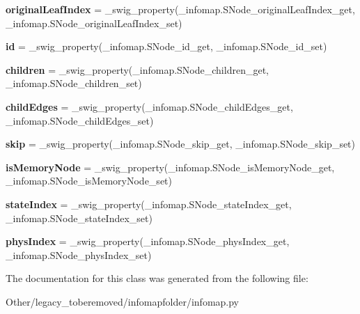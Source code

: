 \begin{DoxyCompactItemize}
{\bfseries original\+Leaf\+Index} = \+\_\+swig\+\_\+property(\+\_\+infomap.\+S\+Node\+\_\+original\+Leaf\+Index\+\_\+get, \+\_\+infomap.\+S\+Node\+\_\+original\+Leaf\+Index\+\_\+set)
\item 
\mbox{\label{classinfomapfolder_1_1infomap_1_1SNode_a147c3f7e69bb73ecd5c413b5bfb509f0}} 
{\bfseries id} = \+\_\+swig\+\_\+property(\+\_\+infomap.\+S\+Node\+\_\+id\+\_\+get, \+\_\+infomap.\+S\+Node\+\_\+id\+\_\+set)
\item 
\mbox{\label{classinfomapfolder_1_1infomap_1_1SNode_ab47222e1920c8f438c1836b3dea33eed}} 
{\bfseries children} = \+\_\+swig\+\_\+property(\+\_\+infomap.\+S\+Node\+\_\+children\+\_\+get, \+\_\+infomap.\+S\+Node\+\_\+children\+\_\+set)
\item 
\mbox{\label{classinfomapfolder_1_1infomap_1_1SNode_a2db4f3e0736e5939a3387071ffadd77d}} 
{\bfseries child\+Edges} = \+\_\+swig\+\_\+property(\+\_\+infomap.\+S\+Node\+\_\+child\+Edges\+\_\+get, \+\_\+infomap.\+S\+Node\+\_\+child\+Edges\+\_\+set)
\item 
\mbox{\label{classinfomapfolder_1_1infomap_1_1SNode_aa603552f919fac9853a80961069692c5}} 
{\bfseries skip} = \+\_\+swig\+\_\+property(\+\_\+infomap.\+S\+Node\+\_\+skip\+\_\+get, \+\_\+infomap.\+S\+Node\+\_\+skip\+\_\+set)
\item 
\mbox{\label{classinfomapfolder_1_1infomap_1_1SNode_a27a301faf60f217624e6d41e7a4f3f1e}} 
{\bfseries is\+Memory\+Node} = \+\_\+swig\+\_\+property(\+\_\+infomap.\+S\+Node\+\_\+is\+Memory\+Node\+\_\+get, \+\_\+infomap.\+S\+Node\+\_\+is\+Memory\+Node\+\_\+set)
\item 
\mbox{\label{classinfomapfolder_1_1infomap_1_1SNode_a838dd6eb236bd8158f351e17651d8847}} 
{\bfseries state\+Index} = \+\_\+swig\+\_\+property(\+\_\+infomap.\+S\+Node\+\_\+state\+Index\+\_\+get, \+\_\+infomap.\+S\+Node\+\_\+state\+Index\+\_\+set)
\item 
\mbox{\label{classinfomapfolder_1_1infomap_1_1SNode_aeb6dc0fd50fec425972fd9a41782e2f3}} 
{\bfseries phys\+Index} = \+\_\+swig\+\_\+property(\+\_\+infomap.\+S\+Node\+\_\+phys\+Index\+\_\+get, \+\_\+infomap.\+S\+Node\+\_\+phys\+Index\+\_\+set)
\end{DoxyCompactItemize}


The documentation for this class was generated from the following file\+:\begin{DoxyCompactItemize}
\item 
Other/legacy\+\_\+toberemoved/infomapfolder/infomap.\+py\end{DoxyCompactItemize}
